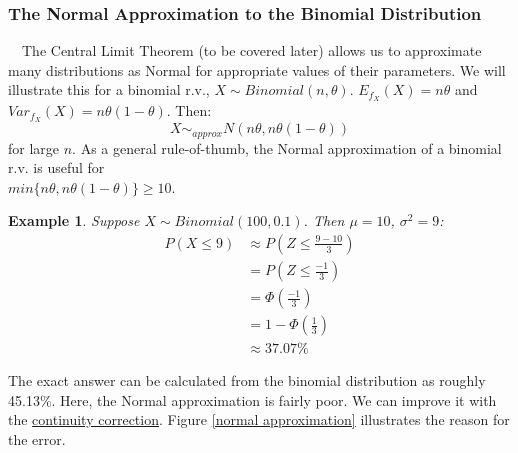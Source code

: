 \documentclass[12pt,a4paper]{article}
\newtheorem{ex}[thm]{Example}
\begin{document}
\subsubsection{The Normal Approximation to the Binomial Distribution}\label{normal approx to bin}

$\quad$The Central Limit Theorem (to be covered later) allows us to approximate many distributions as Normal for appropriate values of their parameters. We will illustrate this for a binomial r.v., $X \sim Binomial(n,\theta)$. $E_{f_X}(X) = n\theta$ and $Var_{f_X}(X) = n\theta(1-\theta)$. Then:
$$X \sim_{approx} N(n\theta,n\theta(1-\theta))$$
for large $n$. As a general rule-of-thumb, the Normal approximation of a binomial r.v. is useful for\\$min\{n\theta,n\theta(1-\theta)\} \geq 10$.

\begin{ex}
\vspace{1cm}

Suppose $X \sim Binomial(100,0.1)$. Then $\mu = 10$, $\sigma^2 = 9$:
\begin{align*}
P(X \leq 9) &\approx P\left(Z \leq \frac{9-10}{3}\right)\\
&=P\left(Z \leq \frac{-1}{3}\right)\\
&= \Phi\left(\frac{-1}{3}\right)\\
&= 1-\Phi\left(\frac{1}{3}\right)\\
&\approx 37.07\%
\end{align*}
\end{ex}

The exact answer can be calculated from the binomial distribution as roughly 45.13\%. Here, the Normal approximation is fairly poor. We can improve it with the \underline{continuity correction}. Figure \ref{normal approximation} illustrates the reason for the error.
\end{document}
